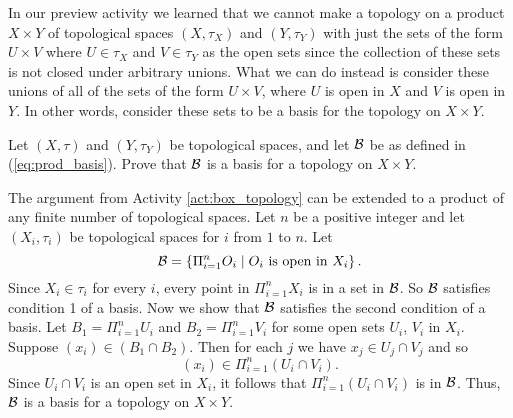 
In our preview activity we learned that we cannot make a topology on a product $X \times Y$ of topological spaces $(X, \tau_X)$ and $(Y , \tau_Y)$ with just the sets of the form $U \times V$ where $U \in \tau_X$ and $V \in \tau_Y$ as the open sets since the collection of these sets is not closed under arbitrary unions. What we can do instead is consider these unions of all of the sets of the form $U \times V$, where $U$ is open in $X$ and $V$ is open in $Y$. In other words, consider these sets to be a basis for the topology on $X \times Y$. 

\begin{activity} \label{act:box_topology} Let $(X, \tau)$ and $(Y, \tau_Y)$ be topological spaces, and let $\mathcal{B}$ be as defined in (\ref{eq:prod_basis}). Prove that $\mathcal{B}$ is a basis for a topology on $X \times Y$.

\end{activity}

\begin{comment}

\ActivitySolution Since $X \in \tau_X$ and $Y \in \tau_Y$, every point in $X \times Y$ is in a set in $\CB$. So $\CB$ satisfies condition 1 of a basis. Suppose $(x,y) \in (U_1 \times V_1) \cap (U_2 \times V_2)$. Then $x \in U_1 \cap U_2$ and $y \in V_1 \cap V_2$, and 
\[(x,y) \in (U_1 \cap U_2) \times (V_1 \cap V_2) \subseteq (U_1 \times V_1) \cap (U_2 \times V_2).\]
So $\CB$ is a basis for a topology on $X \times Y$. 

\end{comment}

The argument from Activity \ref{act:box_topology} can be extended to a product of any finite number of topological spaces. Let $n$ be a positive integer and let $(X_i, \tau_i)$ be topological spaces for $i$ from $1$ to $n$. Let 
\[\mathcal{B} = \left\{ \Pi_{i=1}^n O_i \mid O_i \text{ is open in } X_i\right\}.\]
 Since $X_i \in \tau_i$ for every $i$, every point in $\Pi_{i=1}^n X_i$ is in a set in $\mathcal{B}$. So $\mathcal{B}$ satisfies condition 1 of a basis. Now we show that $\mathcal{B}$ satisfies the second condition of a basis.  Let $B_1 = \Pi_{i=1}^n U_i$ and $B_2 = \Pi_{i=1}^n V_i$ for some open sets $U_i$, $V_i$ in $X_i$. Suppose $(x_i) \in (B_1 \cap B_2)$. Then for each $j$ we have $x_j \in U_j \cap V_j$ and so
\[(x_i) \in \Pi_{i=1}^n (U_i \cap V_i).\]
Since $U_i \cap V_i$ is an open set in $X_i$, it follows that $\Pi_{i=1}^n (U_i \cap V_i)$ is in $\mathcal{B}$. Thus, $\mathcal{B}$ is a basis for a topology on $X \times Y$. 

